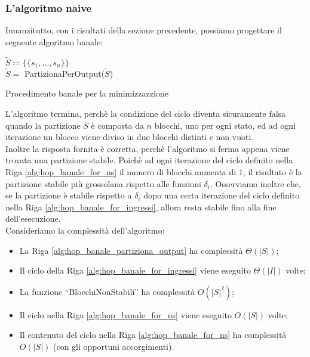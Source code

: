 \subsubsection{L'algoritmo naive}
Innanzitutto, con i risultati della sezione precedente, possiamo progettare il seguente algoritmo banale:\\
\begin{algorithm}[H]
    \label{alg:hop_banale}
    \SetAlgoLined
    \nl$\widetilde{S} \coloneqq \{\{s_1, \dots, s_n\}\}$\;
    \\
    $\widetilde{S} = $ PartizionaPerOutput($\widetilde{S}$)\;\label{alg:hop_banale_partiziona_output}
     {
        \label{alg:hop_banale_for_ingressi}
    }
    \caption{Procedimento banale per la minimizzazzione}
\end{algorithm}
L'algoritmo termina, perchè la condizione del ciclo diventa sicuramente falsa quando la partizione $S$ è composta da $n$ blocchi, uno per ogni stato, ed ad ogni iterazione un blocco viene diviso in due blocchi distinti e non vuoti. \\
Inoltre la risposta fornita è corretta, perchè l'algoritmo si ferma appena viene trovata una partizione stabile. Poichè ad ogni iterazione del ciclo definito nella Riga \ref{alg:hop_banale_for_ns} il numero di blocchi aumenta di 1, il risultato è la partizione stabile più grossolana rispetto alle funzioni $\delta_i$. Osserviamo inoltre che, se la partizione è stabile rispetto a $\delta_i$ dopo una certa iterazione del ciclo definito nella Riga \ref{alg:hop_banale_for_ingressi}, allora resta stabile fino alla fine dell'esecuzione.\\
Consideriamo la complessità dell'algoritmo:
\begin{itemize}
    \item La Riga \ref{alg:hop_banale_partiziona_output} ha complessità $\Theta(|S|)$;
    \item Il ciclo della Riga \ref{alg:hop_banale_for_ingressi} viene eseguito $\Theta(|I|)$ volte;
    \item La funzione ``BlocchiNonStabili'' ha complessità $O(|S|^2)$;
    \item Il ciclo nella Riga \ref{alg:hop_banale_for_ns} viene eseguito $O(|S|)$ volte;
    \item Il contenuto del ciclo nella Riga \ref{alg:hop_banale_for_ns} ha complessità $O(|S|)$ (con gli opportuni accorgimenti).
\end{itemize}
